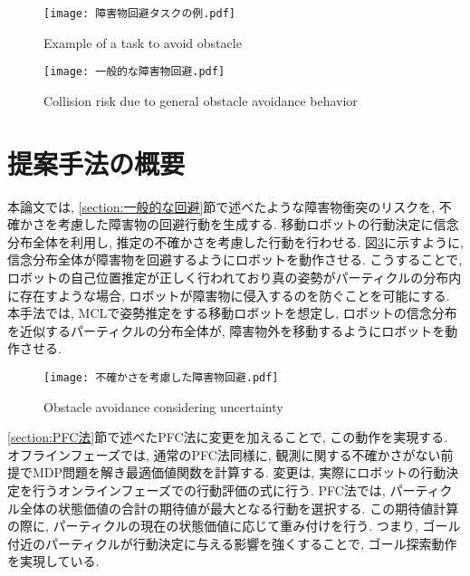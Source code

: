 \begin{figure}[H]
  \begin{center}
    \texttt{[image: 障害物回避タスクの例.pdf]}
    \caption{Example of a task to avoid obstacle}
    \label{fig:障害物回避タスクの例}
  \end{center}
\end{figure}

\begin{figure}[H]
  \begin{center}
    \texttt{[image: 一般的な障害物回避.pdf]}
    \caption{Collision risk due to general obstacle avoidance behavior}
    \label{fig:一般的な障害物回避}
  \end{center}
\end{figure}


\section{提案手法の概要} \label{section:method overview}
本論文では, \ref{section:一般的な回避}節で述べたような障害物衝突のリスクを, 
不確かさを考慮した障害物の回避行動を生成する. 
移動ロボットの行動決定に信念分布全体を利用し, 推定の不確かさを考慮した行動を行わせる. 
図\ref{fig:不確かさを考慮した障害物回避}に示すように, 
信念分布全体が障害物を回避するようにロボットを動作させる. 
こうすることで, ロボットの自己位置推定が正しく行われており真の姿勢がパーティクルの分布内に存在すような場合, 
ロボットが障害物に侵入するのを防ぐことを可能にする. 
本手法では, MCLで姿勢推定をする移動ロボットを想定し, 
ロボットの信念分布を近似するパーティクルの分布全体が, 障害物外を移動するようにロボットを動作させる. 

\begin{figure}[H]
  \begin{center}
    \texttt{[image: 不確かさを考慮した障害物回避.pdf]}
    \caption{Obstacle avoidance considering uncertainty}
    \label{fig:不確かさを考慮した障害物回避}
  \end{center}
\end{figure}

\ref{section:PFC法}節で述べたPFC法に変更を加えることで, この動作を実現する. 
オフラインフェーズでは, 通常のPFC法同様に, 観測に関する不確かさがない前提でMDP問題を解き最適価値関数を計算する. 
変更は, 実際にロボットの行動決定を行うオンラインフェーズでの行動評価の式に行う. 
PFC法では, パーティクル全体の状態価値の合計の期待値が最大となる行動を選択する. 
この期待値計算の際に, パーティクルの現在の状態価値に応じて重み付けを行う. 
つまり, ゴール付近のパーティクルが行動決定に与える影響を強くすることで, ゴール探索動作を実現している. 

